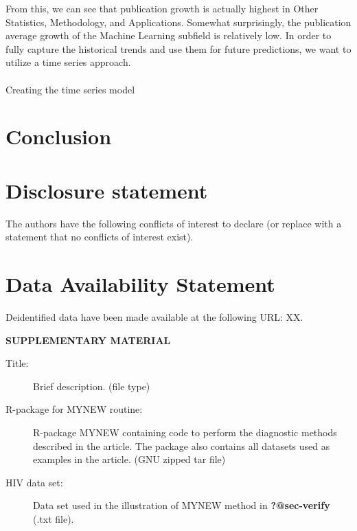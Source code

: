 \documentclass[
  12pt]{article}
\makeatletter
\let\oldparagraph\paragraph
\renewcommand{\paragraph}{
    \@ifstar
      \xxxParagraphStar
      \xxxParagraphNoStar
  }
\newcommand{\xxxParagraphStar}[1]{\oldparagraph*{#1}\mbox{}}
\newcommand{\xxxParagraphNoStar}[1]{\oldparagraph{#1}\mbox{}}
\makeatother
\begin{document}
From this, we can see that publication growth is actually highest in
Other Statistics, Methodology, and Applications. Somewhat surprisingly,
the publication average growth of the Machine Learning subfield is
relatively low. In order to fully capture the historical trends and use
them for future predictions, we want to utilize a time series approach.

\paragraph{Creating the time series
model}\label{creating-the-time-series-model}

\section{Conclusion}\label{sec-conc}

\section{Disclosure statement}\label{disclosure-statement}

The authors have the following conflicts of interest to declare (or
replace with a statement that no conflicts of interest exist).

\section{Data Availability Statement}\label{data-availability-statement}

Deidentified data have been made available at the following URL: XX.

\label{supplementary-material}
\bigskip

\begin{center}

{\large\bf SUPPLEMENTARY MATERIAL}

\end{center}

\begin{description}
\item[Title:]
Brief description. (file type)
\item[R-package for MYNEW routine:]
R-package MYNEW containing code to perform the diagnostic methods
described in the article. The package also contains all datasets used as
examples in the article. (GNU zipped tar file)
\item[HIV data set:]
Data set used in the illustration of MYNEW method in
\textbf{?@sec-verify} (.txt file).
\end{description}


  
\end{document}
